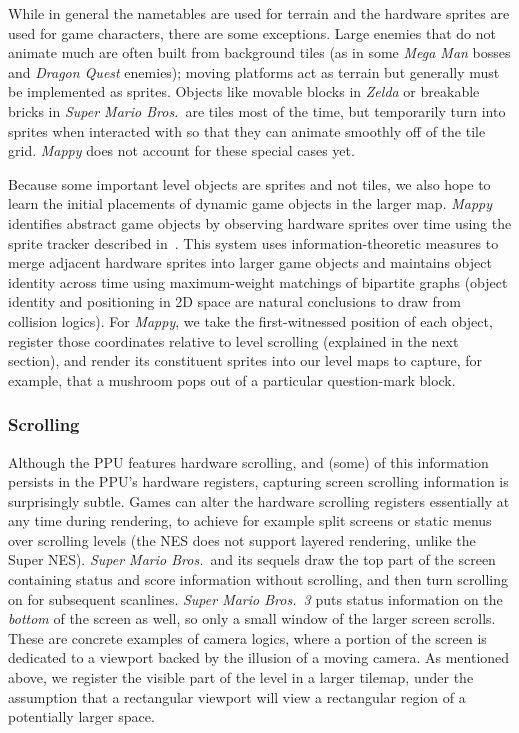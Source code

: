 \documentclass[12pt]{report}
\begin{document}
While in general the nametables are used for terrain and the hardware sprites are used for game characters, there are some exceptions.
Large enemies that do not animate much are often built from background tiles (as in some \emph{Mega Man} bosses and \emph{Dragon Quest} enemies); moving platforms act as terrain but generally must be implemented as sprites.
Objects like movable blocks in \emph{Zelda} or breakable bricks in \emph{Super Mario Bros.}\ are tiles most of the time, but temporarily turn into sprites when interacted with so that they can animate smoothly off of the tile grid.
\emph{Mappy} does not account for these special cases yet.

Because some important level objects are sprites and not tiles, we also hope to learn the initial placements of dynamic game objects in the larger map.
\emph{Mappy} identifies abstract game objects by observing hardware sprites over time using the sprite tracker described in~\cite{summerville2017mechanics}.
This system uses information-theoretic measures to merge adjacent hardware sprites into larger game objects and maintains object identity across time using maximum-weight matchings of bipartite graphs (object identity and positioning in 2D space are natural conclusions to draw from collision logics).
For \emph{Mappy}, we take the first-witnessed position of each object, register those coordinates relative to level scrolling (explained in the next section), and render its constituent sprites into our level maps to capture, for example, that a mushroom pops out of a particular question-mark block.

\subsubsection*{Scrolling}

Although the PPU features hardware scrolling, and (some) of this information persists in the PPU's hardware registers, capturing screen scrolling information is surprisingly subtle.
Games can alter the hardware scrolling registers essentially at any time during rendering, to achieve for example split screens or static menus over scrolling levels (the NES does not support layered rendering, unlike the Super NES).
\emph{Super Mario Bros.}\ and its sequels draw the top part of the screen containing status and score information without scrolling, and then turn scrolling on for subsequent scanlines.
\emph{Super Mario Bros.\ 3} puts status information on the \emph{bottom} of the screen as well, so only a small window of the larger screen scrolls.
These are concrete examples of camera logics, where a portion of the screen is dedicated to a viewport backed by the illusion of a moving camera.
As mentioned above, we register the visible part of the level in a larger tilemap, under the assumption that a rectangular viewport will view a rectangular region of a potentially larger space.
\end{document}
